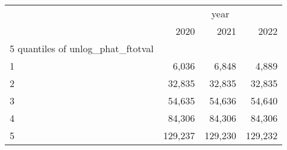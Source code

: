 \begin{tabular}{llll}
\cline{1-4}
\multicolumn{1}{c}{} &
  \multicolumn{3}{|c}{year} \\
\multicolumn{1}{c}{} &
  \multicolumn{1}{|r}{2020} &
  \multicolumn{1}{r}{2021} &
  \multicolumn{1}{r}{2022} \\
\cline{1-4}
\multicolumn{1}{l}{5 quantiles of unlog\_phat\_ftotval} &
  \multicolumn{1}{|r}{} &
  \multicolumn{1}{r}{} &
  \multicolumn{1}{r}{} \\
\multicolumn{1}{l}{\hspace{1em}1} &
  \multicolumn{1}{|r}{6,036} &
  \multicolumn{1}{r}{6,848} &
  \multicolumn{1}{r}{4,889} \\
\multicolumn{1}{l}{\hspace{1em}2} &
  \multicolumn{1}{|r}{32,835} &
  \multicolumn{1}{r}{32,835} &
  \multicolumn{1}{r}{32,835} \\
\multicolumn{1}{l}{\hspace{1em}3} &
  \multicolumn{1}{|r}{54,635} &
  \multicolumn{1}{r}{54,636} &
  \multicolumn{1}{r}{54,640} \\
\multicolumn{1}{l}{\hspace{1em}4} &
  \multicolumn{1}{|r}{84,306} &
  \multicolumn{1}{r}{84,306} &
  \multicolumn{1}{r}{84,306} \\
\multicolumn{1}{l}{\hspace{1em}5} &
  \multicolumn{1}{|r}{129,237} &
  \multicolumn{1}{r}{129,230} &
  \multicolumn{1}{r}{129,232} \\
\cline{1-4}
\end{tabular}
